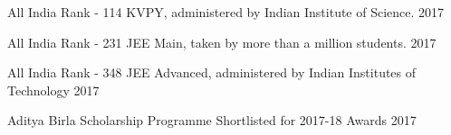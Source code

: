 
\begin{cvhonors}

  \cvhonor
    {All India Rank - 114} %
    {KVPY, administered by Indian Institute of Science.} %
    {} %
    {2017} %

  \cvhonor
    {All India Rank - 231} %
    {JEE Main, taken by more than a million students.} %
    {} %
    {2017} %

  \cvhonor
    {All India Rank - 348} %
    {JEE Advanced, administered by Indian Institutes of Technology} %
    {} %
    {2017} %

  \cvhonor
    {Aditya Birla Scholarship Programme} %
    {Shortlisted for 2017-18 Awards} %
    {} %
    {2017} %

\end{cvhonors}